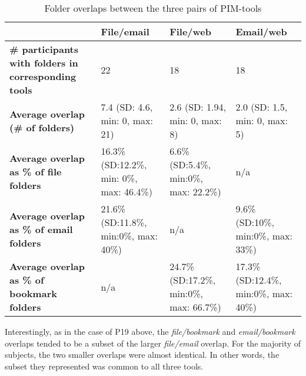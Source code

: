 \begin{table}[hbp]
\begin{center}
\begin{footnotesize}
\setlength{\extrarowheight}{2pt}
\begin{tabular}{|p{4cm}|p{3cm}|p{3cm}|p{3cm}|}
\hline
    {\bf } & {\bf File/email} & {\bf File/web} & {\bf Email/web} \\
\hline
{\bf \# participants with folders in corresponding tools} &         22 &         18 &         18 \\
\hline
{\bf Average overlap (\# of folders)} & 7.4 (SD: 4.6, min: 0, max: 21) & 2.6 (SD: 1.94, min: 0, max: 8) & 2.0 (SD: 1.5, min: 0, max: 5) \\
\hline
{\bf Average overlap as \% of file folders} & 16.3\% (SD:12.2\%, min: 0\%, max: 46.4\%) & 6.6\% (SD:5.4\%, min:0\%, max: 22.2\%) &        n/a \\
\hline
{\bf Average overlap as \% of email folders} & 21.6\% (SD:11.8\%, min:0\%, max: 40\%) &        n/a & 9.6\% (SD:10\%, min:0\%, max: 33\%) \\
\hline
{\bf Average overlap as \% of bookmark folders} &        n/a & 24.7\% (SD:17.2\%, min:0\%, max: 66.7\%) & 17.3\% (SD:12.4\%, min:0\%, max: 40\%) \\
\hline
\end{tabular}  
\end{footnotesize}
\caption{Folder overlaps between the three pairs of PIM-tools}
\label{table:category-overlaps}
\end{center}
\end{table}


Interestingly, as in the case of P19 above, the \textit{file/bookmark} and \textit{email/bookmark} overlaps tended to be a subset of the larger \textit{file/email} overlap. For the majority of subjects, the two smaller overlaps were almost identical. In other words, the subset they represented was common to all three tools.


